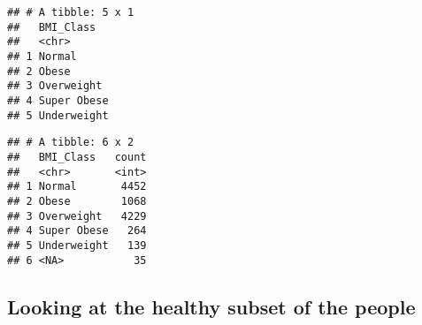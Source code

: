 \documentclass[]{article}
\newenvironment{Shaded}{\begin{snugshade}}{\end{snugshade}}
\newcommand{\KeywordTok}[1]{\textcolor[rgb]{0.13,0.29,0.53}{\textbf{#1}}}
\newcommand{\DataTypeTok}[1]{\textcolor[rgb]{0.13,0.29,0.53}{#1}}
\newcommand{\DecValTok}[1]{\textcolor[rgb]{0.00,0.00,0.81}{#1}}
\newcommand{\FloatTok}[1]{\textcolor[rgb]{0.00,0.00,0.81}{#1}}
\newcommand{\StringTok}[1]{\textcolor[rgb]{0.31,0.60,0.02}{#1}}
\newcommand{\CommentTok}[1]{\textcolor[rgb]{0.56,0.35,0.01}{\textit{#1}}}
\newcommand{\OperatorTok}[1]{\textcolor[rgb]{0.81,0.36,0.00}{\textbf{#1}}}
\newcommand{\NormalTok}[1]{#1}
\begin{document}
\begin{verbatim}
## # A tibble: 5 x 1
##   BMI_Class  
##   <chr>      
## 1 Normal     
## 2 Obese      
## 3 Overweight 
## 4 Super Obese
## 5 Underweight
\end{verbatim}

\begin{Shaded}
\end{Shaded}

\begin{verbatim}
## # A tibble: 6 x 2
##   BMI_Class   count
##   <chr>       <int>
## 1 Normal       4452
## 2 Obese        1068
## 3 Overweight   4229
## 4 Super Obese   264
## 5 Underweight   139
## 6 <NA>           35
\end{verbatim}

\begin{Shaded}
\end{Shaded}

\subsection{Looking at the healthy subset of the
people}\label{looking-at-the-healthy-subset-of-the-people}

\begin{Shaded}
\end{Shaded}
\end{document}
